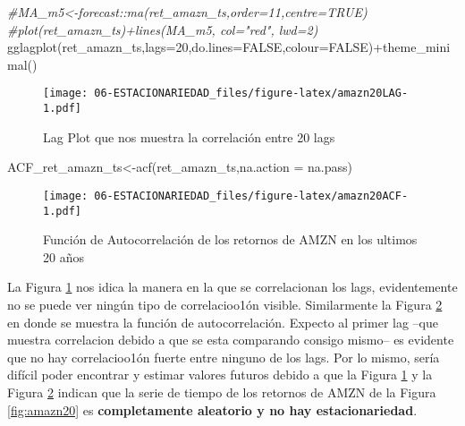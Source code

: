 \documentclass[
]{book}
\newenvironment{Shaded}{\begin{snugshade}}{\end{snugshade}}
\newcommand{\AttributeTok}[1]{\textcolor[rgb]{0.77,0.63,0.00}{#1}}
\newcommand{\CommentTok}[1]{\textcolor[rgb]{0.56,0.35,0.01}{\textit{#1}}}
\newcommand{\ConstantTok}[1]{\textcolor[rgb]{0.00,0.00,0.00}{#1}}
\newcommand{\DecValTok}[1]{\textcolor[rgb]{0.00,0.00,0.81}{#1}}
\newcommand{\FunctionTok}[1]{\textcolor[rgb]{0.00,0.00,0.00}{#1}}
\newcommand{\NormalTok}[1]{#1}
\newcommand{\OtherTok}[1]{\textcolor[rgb]{0.56,0.35,0.01}{#1}}
\newcommand{\SpecialCharTok}[1]{\textcolor[rgb]{0.00,0.00,0.00}{#1}}
\begin{document}
\begin{Shaded}
\begin{Highlighting}[]
\CommentTok{\#MA\_m5\textless{}{-}forecast::ma(ret\_amazn\_ts,order=11,centre=TRUE)}
\CommentTok{\#plot(ret\_amazn\_ts)+lines(MA\_m5, col="red", lwd=2)}
\FunctionTok{gglagplot}\NormalTok{(ret\_amazn\_ts,}\AttributeTok{lags=}\DecValTok{20}\NormalTok{,}\AttributeTok{do.lines=}\ConstantTok{FALSE}\NormalTok{,}\AttributeTok{colour=}\ConstantTok{FALSE}\NormalTok{)}\SpecialCharTok{+}\FunctionTok{theme\_minimal}\NormalTok{()}
\end{Highlighting}
\end{Shaded}

\begin{figure}
\centering
\texttt{[image: 06-ESTACIONARIEDAD\_files/figure-latex/amazn20LAG-1.pdf]}
\caption{\label{fig:amazn20LAG}Lag Plot que nos muestra la correlación entre 20 lags}
\end{figure}

\begin{Shaded}
\begin{Highlighting}[]
\NormalTok{ACF\_ret\_amazn\_ts}\OtherTok{\textless{}{-}}\FunctionTok{acf}\NormalTok{(ret\_amazn\_ts,}\AttributeTok{na.action =}\NormalTok{ na.pass)}
\end{Highlighting}
\end{Shaded}

\begin{figure}
\centering
\texttt{[image: 06-ESTACIONARIEDAD\_files/figure-latex/amazn20ACF-1.pdf]}
\caption{\label{fig:amazn20ACF}Función de Autocorrelación de los retornos de AMZN en los ultimos 20 años}
\end{figure}

La Figura \ref{fig:amazn20LAG} nos idica la manera en la que se correlacionan los lags, evidentemente no se puede ver ningún tipo de correlacioo1ón visible. Similarmente la Figura \ref{fig:amazn20ACF} en donde se muestra la función de autocorrelación. Expecto al primer lag --que muestra correlacion debido a que se esta comparando consigo mismo-- es evidente que no hay correlacioo1ón fuerte entre ninguno de los lags. Por lo mismo, sería difícil poder encontrar y estimar valores futuros debido a que la Figura \ref{fig:amazn20LAG} y la Figura \ref{fig:amazn20ACF} indican que la serie de tiempo de los retornos de AMZN de la Figura \ref{fig:amazn20} es \textbf{completamente aleatorio y no hay estacionariedad}.

  
\end{document}
